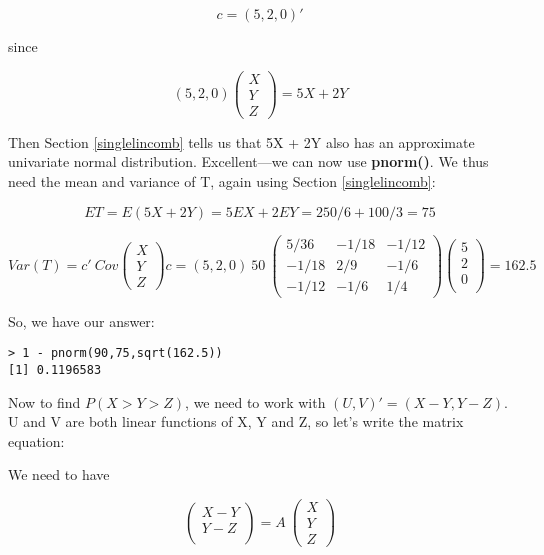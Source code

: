 \begin{equation}
c = (5,2,0)'
\end{equation}

since

\begin{equation}
(5,2,0) 
\left (
\begin{array}{c}
X \\
Y \\
Z 
\end{array}
\right )
=  5X + 2Y
\end{equation}

Then Section \ref{singlelincomb} tells us that 5X + 2Y also has an
approximate univariate normal distribution.  Excellent---we can now use
{\bf pnorm()}.  We thus need the mean and variance of T, again using
Section \ref{singlelincomb}:

\begin{equation}
ET = E(5X+2Y) = 5 EX + 2 EY = 250/6 + 100/3 = 75
\end{equation}

\begin{equation}
Var(T) =
c' ~ Cov
\left (
\begin{array}{c}
X \\
Y \\
Z 
\end{array}
\right )
c
=
(5,2,0) ~
50 ~
\left (
\begin{array}{rrr}
5/36 & -1/18 & -1/12 \\
-1/18 & 2/9 & -1/6 \\
-1/12 & -1/6 & 1/4 
\end{array}
\right )
\left (
\begin{array}{r}
5 \\
2 \\
0 \\
\end{array}
\right )
= 162.5
\end{equation}

So, we have our answer:

\begin{lstlisting}
> 1 - pnorm(90,75,sqrt(162.5))
[1] 0.1196583
\end{lstlisting}

Now to find $P(X > Y > Z)$, we need to work with $(U,V)' = (X-Y,Y-Z)$. 
U and V are both linear functions of X, Y and Z, so let's write the
matrix equation:

We need to have

\begin{equation}
\left (
\begin{array}{r}
X-Y \\
Y-Z \\
\end{array}
\right )
=
A ~
\left (
\begin{array}{c}
X \\
Y \\
Z 
\end{array}
\right )
\end{equation}

